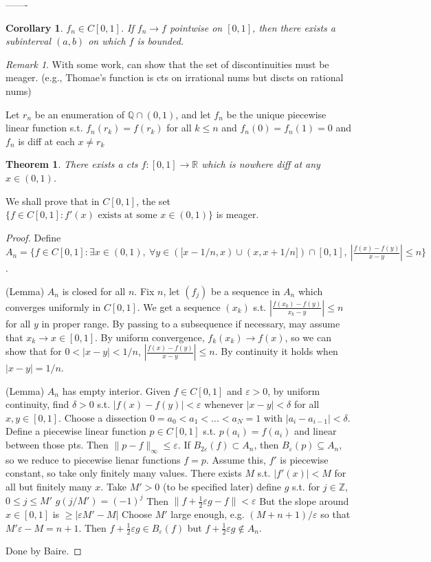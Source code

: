 \documentclass{article}
\newcommand{\e}{\varepsilon}
\theoremstyle{definition}
\theoremstyle{remark}
\newtheorem{rem}{Remark}
\theoremstyle{plain}
\newtheorem{thm}[defn]{Theorem}
\newtheorem{crly}[defn]{Corollary}
\newcommand{\ZZ}{\mathbb{Z}}
\newcommand{\QQ}{\mathbb{Q}}
\newcommand{\RR}{\mathbb{R}}
\begin{document}
-------

\begin{crly}
    $f_n\in C[0,1]$. If $f_n\to f$ pointwise on $[0,1]$, then there exists a subinterval $(a,b)$ on which $f$ is bounded.
\end{crly}
\begin{rem}
    With some work, can show that the set of discontinuities must be meager. (e.g., Thomae's function is cts on irrational nums but discts on rational nums) 

    Let $r_n$ be an enumeration of $\QQ\cap (0,1)$, and let $f_n$ be the unique piecewise linear function s.t. $f_n(r_k)=f(r_k)$ for all $k\le n$ and $f_n(0)=f_n(1)=0$ and $f_n$ is diff at each $x\neq r_k$
\end{rem}
\begin{thm}
    There exists a cts $f:[0,1]\to\RR$ which is nowhere diff at any $x\in(0,1)$.
\end{thm}
We shall prove that in $C[0,1]$, the set $\{f\in C[0,1]:f'(x)\text{ exists at some }x\in(0,1)\}$ is meager.
\begin{proof}
    Define $A_n=\{f\in C[0,1]:\exists x\in (0,1),\ \forall y\in ([x-1/n,x)\cup(x,x+1/n])\cap [0,1],\ |\frac{f(x)-f(y)}{x-y}|\le n\}$.

    (Lemma) $A_n$ is closed for all $n$. Fix $n$, let $(f_j)$ be a sequence in $A_n$ which converges uniformly in $C[0,1]$. We get a sequence $(x_k)$ s.t. $|\frac{f(x_k)-f(y)}{x_k-y}|\le n$ for all $y$ in proper range. By passing to a subsequence if necessary, may assume that $x_k\to x\in[0,1]$. By uniform convergence, $f_k(x_k)\to f(x)$, so we can show that for $0<|x-y|<1/n$, $|\frac{f(x)-f(y)}{x-y}|\le n$. By continuity it holds when $|x-y|=1/n$.

    (Lemma) $A_n$ has empty interior. Given $f\in C[0,1]$ and $\e>0$, by uniform continuity, find $\delta>0$ s.t. $|f(x)-f(y)|<\e$ whenever $|x-y|<\delta$ for all $x,y\in[0,1]$. Choose a dissection $0=a_0<a_1<...<a_N=1$ with $|a_i-a_{i-1}|<\delta$. Define a piecewise linear function $p\in C[0,1]$ s.t. $p(a_i)=f(a_i)$ and linear between those pts. Then $\|p-f\|_\infty\le\e$. If $B_{2\e}(f)\subset A_n$, then $B_\e(p)\subseteq A_n$, so we reduce to piecewise lienar functions $f=p$. Assume this, $f'$ is piecewise constant, so take only finitely many values. There exists $M$ s.t. $|f'(x)|<M$ for all but finitely many $x$. Take $M'>0$ (to be specified later) define $g$ s.t. for $j\in\ZZ$, $0\le j\le M'$ $g(j/M')=(-1)^j$ Then $\|f+\frac12\e g-f\|<\e$ But the slope around $x\in[0,1]$ is $\ge |\e M'-M|$ Choose $M'$ large enough, e.g. $(M+n+1)/\e$ so that $M'\e-M=n+1$. Then $f+\frac12\e g\in B_\e(f)$ but $f+\frac12\e g\notin A_n$.

    Done by Baire.
\end{proof}
\end{document}
